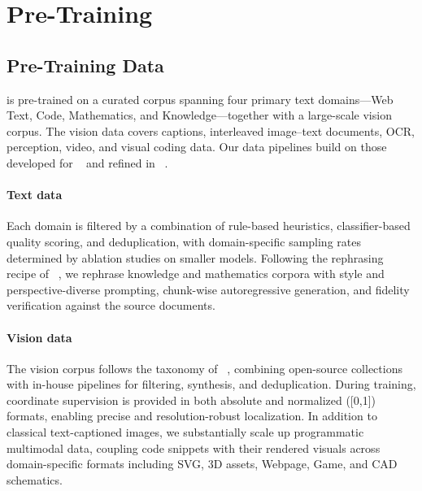 \section{Pre-Training}

\subsection{Pre-Training Data}                        
 is pre-trained on a curated corpus spanning four primary text
domains---Web Text, Code, Mathematics, and Knowledge---together with a
large-scale vision corpus. The vision data covers captions, interleaved image--text
documents, OCR, perception, video, and visual coding data. Our
data pipelines build on those developed for ~\citep{kimiteam2025kimik2openagentic} and
refined in ~\citep{kimik25}.                                                                                                            
 \paragraph{Text data} Each domain is filtered by a combination of rule-based heuristics, classifier-based quality scoring, and deduplication, with domain-specific sampling rates determined by ablation studies on smaller models. Following the rephrasing recipe of ~\citep{kimiteam2025kimik2openagentic}, we rephrase knowledge and mathematics corpora with style and perspective-diverse prompting, chunk-wise autoregressive generation, and fidelity verification against the source documents.                   

 
 \paragraph{Vision data} The vision corpus follows the taxonomy of ~\citep{kimik25}, combining open-source collections with in-house pipelines for filtering, synthesis, and deduplication.
 During training, coordinate supervision is provided in both absolute and normalized ([0,1]) formats, enabling precise and resolution-robust localization.
 In addition to classical text-captioned images, we substantially scale up programmatic multimodal data, coupling code snippets with their rendered visuals across domain-specific formats including SVG, 3D assets, Webpage, Game, and CAD schematics.


